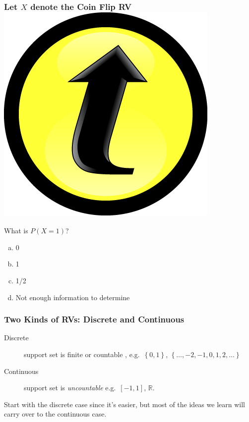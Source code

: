 \documentclass[handout]{beamer}
\begin{document}
\begin{frame}
  \frametitle{Let $X$ denote the Coin Flip RV \hfill\includegraphics[scale = 0.05]{./images/clicker}}
  What is $P\left( X=1 \right)$?

  \vspace{1em}

  \begin{enumerate}[(a)]
    \item 0 
    \item 1  
    \item 1/2 
    \item Not enough information to determine
  \end{enumerate}
\end{frame}
\begin{frame}
  \frametitle{Two Kinds of RVs: Discrete and Continuous}
  \begin{description}
    \item[Discrete] support set is finite or countable , e.g.\ $\left\{ 0,1 \right\}$,  $\left\{ \hdots, -2, -1, 0, 1, 2,\hdots \right\}$
    \item[Continuous] support set is \emph{uncountable} e.g.\ $[-1,1]$, $\mathbb{R}$.
  \end{description}

  \vspace{1em}

  \alert{Start with the discrete case since it's easier, but most of the ideas we learn will carry over to the continuous case.}
\end{frame}
\end{document}
